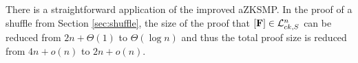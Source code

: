 There is a straightforward application of the improved aZKSMP. In the proof of a shuffle from Section \ref{sec:shuffle}, the size of the proof that $[\mathbf{{F}}]\in\mathcal{L}_{ck,S}^n$ can be reduced from $2n+\Theta(1)$ to $\Theta(\log n)$ and thus the total proof size is reduced from $4n+o(n)$ to $2n+o(n)$.
\fi
